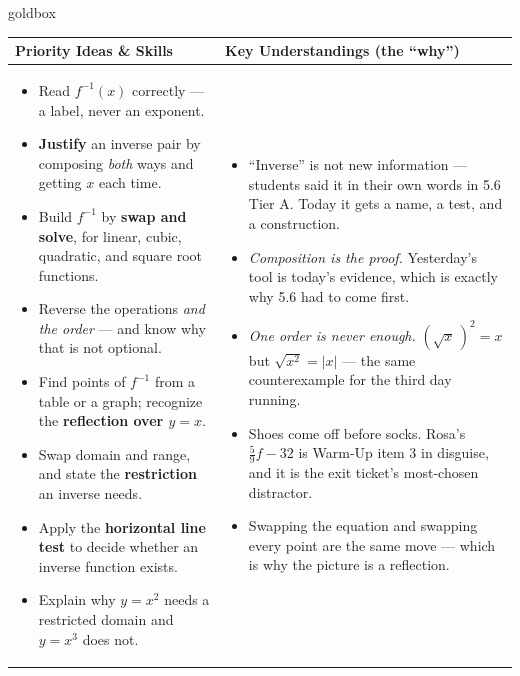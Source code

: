 \documentclass[10pt]{article}
\begin{document}
\renewcommand{\arraystretch}{1.4}
\begin{skillbox}{goldbox}
\begin{tabularx}{\linewidth}{@{}X|X@{}}
\textbf{Priority Ideas \& Skills} & \textbf{Key Understandings (the ``why'')} \\[2pt]
\hline
\vspace{-6pt}
\begin{itemize}[leftmargin=1.1em, nosep, after=\vspace{2pt}]
  \item Read $f^{-1}(x)$ correctly --- a label, never an exponent.
  \item \textbf{Justify} an inverse pair by composing \emph{both} ways and getting $x$ each time.
  \item Build $f^{-1}$ by \textbf{swap and solve}, for linear, cubic, quadratic, and square root functions.
  \item Reverse the operations \emph{and the order} --- and know why that is not optional.
  \item Find points of $f^{-1}$ from a table or a graph; recognize the \textbf{reflection over $y=x$}.
  \item Swap domain and range, and state the \textbf{restriction} an inverse needs.
  \item Apply the \textbf{horizontal line test} to decide whether an inverse function exists.
  \item Explain why $y=x^{2}$ needs a restricted domain and $y=x^{3}$ does not.
\end{itemize}
&
\vspace{-6pt}
\begin{itemize}[leftmargin=1.1em, nosep, after=\vspace{2pt}]
  \item ``Inverse'' is not new information --- students said it in their own words in 5.6 Tier A. Today it gets a name, a test, and a construction.
  \item \emph{Composition is the proof.} Yesterday's tool is today's evidence, which is exactly why 5.6 had to come first.
  \item \emph{One order is never enough.} $\left(\sqrt{x}\,\right)^{2}=x$ but $\sqrt{x^{2}}=|x|$ --- the same counterexample for the third day running.
  \item Shoes come off before socks. Rosa's $\frac59f-32$ is Warm-Up item 3 in disguise, and it is the exit ticket's most-chosen distractor.
  \item Swapping the equation and swapping every point are the same move --- which is why the picture is a reflection.

\end{itemize}
\end{tabularx}
\end{skillbox}
\end{document}
